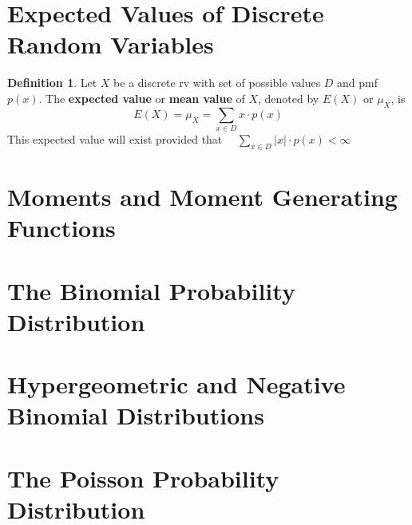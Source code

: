 \documentclass[a4paper]{report}
\theoremstyle{definition}
\newtheorem{definition}{Definition}
\theoremstyle{plain}
\begin{document}
\section{Expected Values of Discrete Random Variables}
\begin{definition}
  Let $X$ be a discrete rv with set of possible values $D$ and pmf 
  $p(x)$. The \textbf{expected value} or \textbf{mean value} of $X$,
  denoted by $E(X)$ or $\mu_X$, is
  \begin{equation*}
    E(X) = \mu_X = \sum_{x \in D} x \cdot p(x)
  \end{equation*}
  This expected value will exist provided that $\quad \sum_{x \in D} 
  |x| \cdot p(x) < \infty$
\end{definition}

\section{Moments and Moment Generating Functions}

\section{The Binomial Probability Distribution}

\section{Hypergeometric and Negative Binomial Distributions}

\section{The Poisson Probability Distribution}
\end{document}

